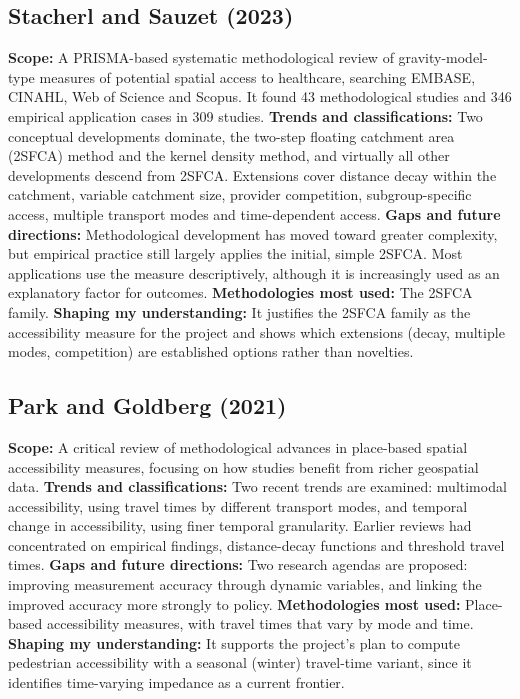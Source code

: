 \documentclass[pdflatex,sn-mathphys-num]{sn-jnl}
\begin{document}
\subsection{Stacherl and Sauzet (2023) \cite{stacherl2023}}
\textbf{Scope:} A PRISMA-based systematic methodological review of gravity-model-type measures of potential spatial access to healthcare, searching EMBASE, CINAHL, Web of Science and Scopus. It found 43 methodological studies and 346 empirical application cases in 309 studies.
\textbf{Trends and classifications:} Two conceptual developments dominate, the two-step floating catchment area (2SFCA) method and the kernel density method, and virtually all other developments descend from 2SFCA. Extensions cover distance decay within the catchment, variable catchment size, provider competition, subgroup-specific access, multiple transport modes and time-dependent access.
\textbf{Gaps and future directions:} Methodological development has moved toward greater complexity, but empirical practice still largely applies the initial, simple 2SFCA. Most applications use the measure descriptively, although it is increasingly used as an explanatory factor for outcomes.
\textbf{Methodologies most used:} The 2SFCA family.
\textbf{Shaping my understanding:} It justifies the 2SFCA family as the accessibility measure for the project and shows which extensions (decay, multiple modes, competition) are established options rather than novelties.

\subsection{Park and Goldberg (2021) \cite{park2021}}
\textbf{Scope:} A critical review of methodological advances in place-based spatial accessibility measures, focusing on how studies benefit from richer geospatial data.
\textbf{Trends and classifications:} Two recent trends are examined: multimodal accessibility, using travel times by different transport modes, and temporal change in accessibility, using finer temporal granularity. Earlier reviews had concentrated on empirical findings, distance-decay functions and threshold travel times.
\textbf{Gaps and future directions:} Two research agendas are proposed: improving measurement accuracy through dynamic variables, and linking the improved accuracy more strongly to policy.
\textbf{Methodologies most used:} Place-based accessibility measures, with travel times that vary by mode and time.
\textbf{Shaping my understanding:} It supports the project's plan to compute pedestrian accessibility with a seasonal (winter) travel-time variant, since it identifies time-varying impedance as a current frontier.
\end{document}
